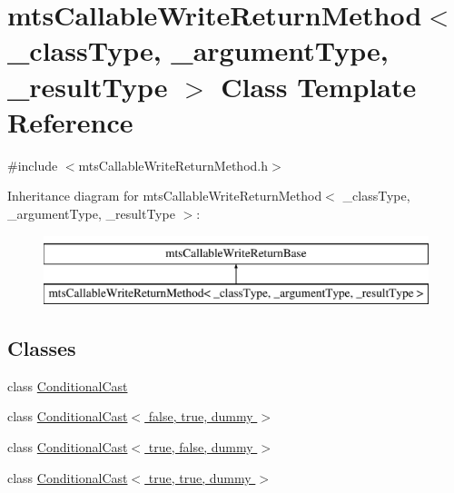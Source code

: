 \hypertarget{classmts_callable_write_return_method}{\section{mts\-Callable\-Write\-Return\-Method$<$ \-\_\-class\-Type, \-\_\-argument\-Type, \-\_\-result\-Type $>$ Class Template Reference}
\label{classmts_callable_write_return_method}
}


{\ttfamily \#include $<$mts\-Callable\-Write\-Return\-Method.\-h$>$}

Inheritance diagram for mts\-Callable\-Write\-Return\-Method$<$ \-\_\-class\-Type, \-\_\-argument\-Type, \-\_\-result\-Type $>$\-:\begin{figure}[H]
\begin{center}
\leavevmode
\includegraphics[height=2.000000cm]{d8/d94/classmts_callable_write_return_method}
\end{center}
\end{figure}
\subsection*{Classes}
\begin{DoxyCompactItemize}
\item 
class \hyperlink{classmts_callable_write_return_method_1_1_conditional_cast}{Conditional\-Cast}
\item 
class \hyperlink{classmts_callable_write_return_method_1_1_conditional_cast_3_01false_00_01true_00_01dummy_01_4}{Conditional\-Cast$<$ false, true, dummy $>$}
\item 
class \hyperlink{classmts_callable_write_return_method_1_1_conditional_cast_3_01true_00_01false_00_01dummy_01_4}{Conditional\-Cast$<$ true, false, dummy $>$}
\item 
class \hyperlink{classmts_callable_write_return_method_1_1_conditional_cast_3_01true_00_01true_00_01dummy_01_4}{Conditional\-Cast$<$ true, true, dummy $>$}
\end{DoxyCompactItemize}
